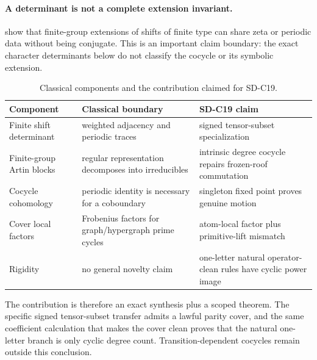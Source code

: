 \paragraph{A determinant is not a complete extension invariant.}
\citet{BoyleSchmieding2017} show that finite-group extensions of shifts of
finite type can share zeta or periodic data without being conjugate.  This is
an important claim boundary: the exact character determinants below do not
classify the cocycle or its symbolic extension.

\begin{table}[t]
\centering
\caption{Classical components and the contribution claimed for SD-C19.}
\label{tab:literature-boundary}
\small
\begin{tabularx}{\textwidth}{L{0.24\textwidth}
  >{\raggedright\arraybackslash}X
  >{\raggedright\arraybackslash}X}
\toprule
Component & Classical boundary & SD-C19 claim \\
\midrule
Finite shift determinant
& weighted adjacency and periodic traces
& signed tensor-subset specialization \\
Finite-group Artin blocks
& regular representation decomposes into irreducibles
& intrinsic degree cocycle repairs frozen-roof commutation \\
Cocycle cohomology
& periodic identity is necessary for a coboundary
& singleton fixed point proves genuine motion \\
Cover local factors
& Frobenius factors for graph/hypergraph prime cycles
& atom-local factor plus primitive-lift mismatch \\
Rigidity
& no general novelty claim
& one-letter natural operator-clean rules have cyclic power image \\
\bottomrule
\end{tabularx}
\end{table}

The contribution is therefore an exact synthesis plus a scoped theorem.  The
specific signed tensor-subset transfer admits a lawful parity cover, and the
same coefficient calculation that makes the cover clean proves that the
natural one-letter branch is only cyclic degree count.  Transition-dependent
cocycles remain outside this conclusion.
